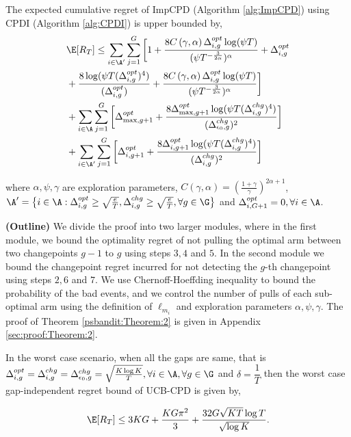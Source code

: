 \begin{customtheorem}{2}
\label{psbandit:Theorem:2}
The expected cumulative regret of ImpCPD (Algorithm \ref{alg:ImpCPD}) using CPDI (Algorithm \ref{alg:CPDI}) is upper bounded by,
\begin{align*}
& \E[R_T] \leq \sum_{i\in\A'}\sum_{j=1}^{G}\bigg[ 1 
+  \dfrac{8C\left(\gamma, \alpha \right)\Delta^{opt}_{i,g}\log(\psi T )}{(\psi T^{-\frac{3}{2\alpha}})^{\alpha}}  + \Delta^{opt}_{i,g}\\
&  + \dfrac{8\log(\psi T(\Delta^{opt}_{i,g})^4)}{(\Delta^{opt}_{i,g})}
 +   \dfrac{8C\left(\gamma, \alpha \right)\Delta^{opt}_{i,g}\log(\psi T )}{(\psi T^{-\frac{3}{2\alpha}})^{\alpha}}  \bigg]\\
& + \sum_{i\in\A}\sum_{j=1}^{G}\bigg[\Delta^{opt}_{\max,g+1} + \dfrac{8\Delta^{opt}_{\max,g+1}\log(\psi T(\Delta^{chg}_{i,g})^4)}{(\Delta^{chg}_{\epsilon_0,g})^2}\bigg]\\
& + \sum_{i\in\A'}\sum_{j=1}^{G}\bigg[\Delta^{opt}_{i,g+1} + \dfrac{8\Delta^{opt}_{i,g+1}\log(\psi T(\Delta^{chg}_{i,g})^4)}{(\Delta^{chg}_{i,g})^2}
\bigg]
\end{align*}

where $\alpha,\psi,\gamma$ are exploration parameters, $C\left( \gamma,\alpha\right)=\left( \frac{1+\gamma}{\gamma}\right)^{2\alpha + 1}$, $\A'=\big\lbrace i\in\A: \Delta^{opt}_{i,g}\geq \sqrt{\frac{e}{T}}, \Delta^{chg}_{i,g}\geq \sqrt{\frac{e}{T}},\forall g\in\G \big\rbrace$ and $\Delta^{opt}_{i,{G+1}} = 0,\forall i\in\A$.
\end{customtheorem}

\begin{customproof}{4} \textbf{(Outline)}
We divide the proof into two larger modules, where in the first module, we bound the optimality regret of not pulling the optimal arm between two changepoints $g-1$ to $g$ using steps $3,4$ and $5$. In the second module we bound the changepoint regret incurred for not detecting the $g$-th changepoint using steps $2,6$ and $7$. We use Chernoff-Hoeffding inequality to bound the probability of the bad events, and we control the number of pulls of each sub-optimal arm using the definition of $\ell_{m_i}$ and exploration parameters $\alpha,\psi,\gamma$. The proof of Theorem \ref{psbandit:Theorem:2} is given in Appendix \ref{sec:proof:Theorem:2}.
\end{customproof}

\begin{customcorollary}{1}
\label{psbandit:Corollary:1}
In the worst case scenario, when all the gaps are same, that is $\Delta^{opt}_{i,g}=\Delta^{chg}_{i,g}=\Delta^{chg}_{\epsilon_0,g}=\sqrt{\frac{K\log K}{T}}, \forall i\in\A,\forall g\in\G$ and $\delta=\dfrac{1}{T}$ then the worst case gap-independent regret bound of UCB-CPD is given by,

\begin{align*}
\E[R_{T}] \leq 3KG + \dfrac{KG \pi^2}{3} + \dfrac{32G\sqrt{KT}\log T}{\sqrt{{\log K}}}.
\end{align*}


\end{customcorollary}

